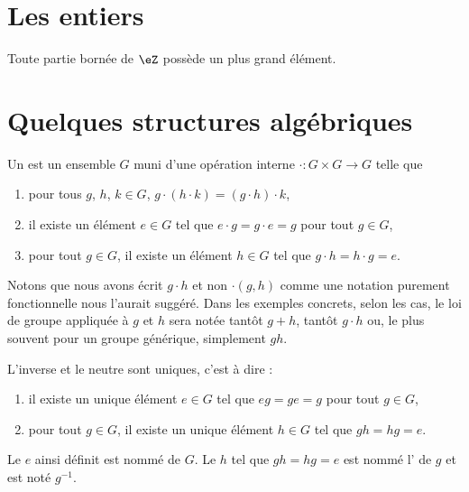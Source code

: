 \section{Les entiers}


\begin{lemma}       \label{LEMooMYEIooNFwNVI}
    Toute partie bornée de \( \eZ\) possède un plus grand élément.
\end{lemma}

\section{Quelques structures algébriques}

\begin{definition}[Groupe]
    Un  est un ensemble \( G\) muni d'une opération interne \( \cdot\colon G\times G\to G\) telle que
    \begin{enumerate}
        \item
            pour tous \( g\), \( h\), \( k\in G\), \( g\cdot(h\cdot k)=(g\cdot h)\cdot k\),
        \item
            il existe un élément \( e\in G\) tel que \( e\cdot g=g\cdot e=g\) pour tout \( g\in G\),
        \item
            pour tout \( g\in G\), il existe un élément \( h\in  G\) tel que \(g\cdot h=h\cdot g=e \).
    \end{enumerate}
\end{definition}

    Notons que nous avons écrit \( g\cdot h\) et non \( \cdot(g,h)\) comme une notation purement fonctionnelle nous l'aurait suggéré. Dans les exemples concrets, selon les cas, le loi de groupe appliquée à \( g\) et \( h\) sera notée tantôt \( g+h\), tantôt \( g\cdot h\) ou, le plus souvent pour un groupe générique, simplement \( gh\).

\begin{lemmaDef}[Unicités]
    L'inverse et le neutre sont uniques, c'est à dire :
    \begin{enumerate}
        \item
            il existe un unique élément \( e\in G\) tel que \( e g=g e=g\) pour tout \( g\in G\),
        \item
            pour tout \( g\in G\), il existe un unique élément \( h\in  G\) tel que \(g h=h g=e \).
    \end{enumerate}
    Le \( e\) ainsi définit est nommé  de \( G\). Le \( h\) tel que \( g h=h g=e\) est nommé l' de \( g\) et est noté \( g^{-1}\).
\end{lemmaDef}

